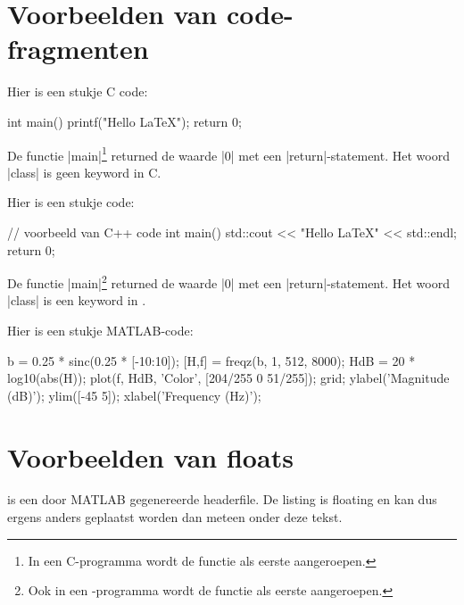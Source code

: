 \chapter[Voorbeelden van codefragmenten]{Voorbeelden van code-\\fragmenten}
Hier is een stukje C code:
\begin{lstfragment}[style=cstyle]
int main() {
    printf("Hello LaTeX");
    return 0;
}
\end{lstfragment}
\begin{clstShortInline}
De functie |main|\footnote{%
    In een C-programma wordt de functie  als eerste aangeroepen.
} returned de waarde |0| met een |return|-statement.
 Het woord |class| is geen keyword in C.
\end{clstShortInline}

Hier is een stukje \Cpp{} code:
\begin{lstfragment}[style=cstyle]
// voorbeeld van C++ code
int main() {
    std::cout << "Hello LaTeX" << std::endl;
    return 0;
}
\end{lstfragment}
\begin{cpplstShortInline}
De functie |main|\footnote{%
    Ook in een \Cpp{}-programma wordt de functie  als eerste aangeroepen.
} returned de waarde |0| met een |return|-statement.
Het woord |class| is een keyword in \Cpp{}.
\end{cpplstShortInline}

Hier is een stukje MATLAB-code:
\begin{lstfragment}[style=mstyle]
b = 0.25 * sinc(0.25 * [-10:10]);
[H,f] = freqz(b, 1, 512, 8000);
HdB = 20 * log10(abs(H));
plot(f, HdB, 'Color', [204/255 0 51/255]);
grid;
ylabel('Magnitude (dB)');
ylim([-45 5]);
xlabel('Frequency (Hz)');
\end{lstfragment}

\clearpage
\chapter{Voorbeelden van floats}

 is een door MATLAB gegenereerde headerfile.
De listing is floating  en kan dus ergens anders geplaatst worden dan meteen onder deze tekst.


